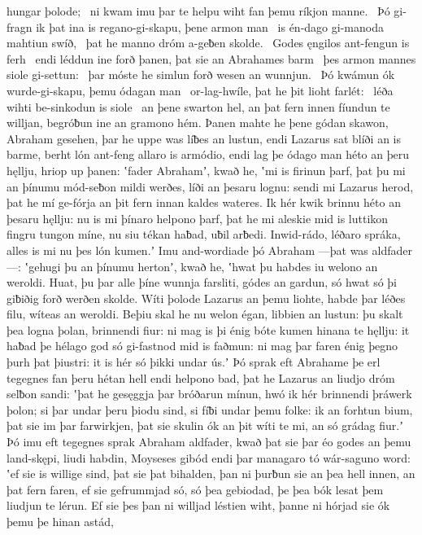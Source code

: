 hungar þolode; \hld\ ni kwam imu þar te helpu wiht
fan þemu ríkjon manne. \hld\ Þó gi-fragn ik þat ina is regano-gi-skapu,
þene armon man \hld\ is én-dago
gi-manoda mahtiun swíð, \hld\ þat he manno dróm
a-geƀen skolde. \hld\ Godes ęngilos
ant-fengun is ferh \hld\ endi léddun ine forð þanen,
þat sie an Abrahames barm \hld\ þes armon mannes
siole gi-settun: \hld\ þar móste he simlun forð
wesen an wunnjun. \hld\ Þó kwámun ók wurde-gi-skapu,
þemu ódagan man \hld\ or-lag-hwíle,
þat he þit lioht farlét: \hld\ léða wihti
be-sinkodun is siole \hld\ an þene swarton hel,
an þat fern innen fíundun te willjan,
begróƀun ine an gramono hém. Þanen mahte he þene gódan skawon,
Abraham gesehen, þar he uppe was
líƀes an lustun, endi Lazarus sat
blíði an is barme, berht lón ant-feng
allaro is armódio, endi lag þe ódago man
héto an þeru hęllju, hriop up þanen:
ʽfader Abrahamʼ, kwað he, ʽmi is firinun þarf,
þat þu mi an þínumu mód-seƀon mildi werðes,
líði an þesaru lognu: sendi mi Lazarus herod,
þat he mí ge-fórja an þit fern innan
kaldes wateres. Ik hér kwik brinnu
héto an þesaru hęllju: nu is mi þínaro helpono þarf,
þat he mi aleskie mid is luttikon fingru
tungon míne, nu siu tékan haƀad,
uƀil arƀedi. Inwid-rádo,
léðaro spráka, alles is mi nu þes lón kumen.ʼ
Imu and-wordiade þó Abraham —þat was aldfader—:
ʽgehugi þu an þínumu hertonʼ, kwað he, ʽhwat þu habdes iu
welono an weroldi. Huat, þu þar alle þíne wunnja farsliti,
gódes an gardun, só hwat só þi giƀiðig forð
werðen skolde. Wíti þolode
Lazarus an þemu liohte, habde þar léðes filu,
wíteas an weroldi. Beþiu skal he nu welon égan,
libbien an lustun: þu skalt þea logna þolan,
brinnendi fiur: ni mag is þi énig bóte kumen
hinana te hęllju: it haƀad þe hélago god
só gi-fastnod mid is faðmun: ni mag þar faren énig
þegno þurh þat þiustri: it is hér só þikki undar ús.ʼ
Þó sprak eft Abrahame þe erl tegegnes
fan þeru hétan hell endi helpono bad,
þat he Lazarus an liudjo dróm
selƀon sandi: ʽþat he gesęggja þar
bróðarun mínun, hwó ik hér brinnendi
þráwerk þolon; si þar undar þeru þiodu sind,
si fíƀi undar þemu folke: ik an forhtun bium,
þat sie im þar farwirkjen, þat sie skulin ók an þit wíti te mi,
an só grádag fiur.ʼ Þó imu eft tegegnes sprak
Abraham aldfader, kwað þat sie þar éo godes
an þemu land-skępi, liudi habdin,
Moyseses gibód endi þar managaro tó
wár-saguno word: ʽef sie is willige sind,
þat sie þat bihalden, þan ni þurƀun sie an þea hell innen,
an þat fern faren, ef sie gefrummjad só,
só þea gebiodad, þe þea bók lesat
þem liudjun te lérun. Ef sie þes þan ni willjad léstien wiht,
þanne ni hórjad sie ók þemu þe hinan astád,
